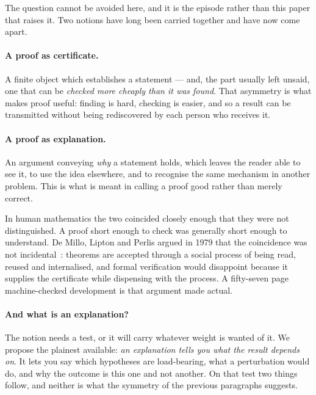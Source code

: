 \documentclass[11pt]{article}
\begin{document}
The question cannot be avoided here, and it is the episode rather than this paper that raises it. Two
notions have long been carried together and have now come apart.

\paragraph{A proof as certificate.} A finite object which establishes a statement --- and, the part
usually left unsaid, one that can be \emph{checked more cheaply than it was found}. That asymmetry is
what makes proof useful: finding is hard, checking is easier, and so a result can be transmitted
without being rediscovered by each person who receives it.

\paragraph{A proof as explanation.} An argument conveying \emph{why} a statement holds, which leaves
the reader able to see it, to use the idea elsewhere, and to recognise the same mechanism in another
problem. This is what is meant in calling a proof good rather than merely correct.

In human mathematics the two coincided closely enough that they were not distinguished. A proof short
enough to check was generally short enough to understand. De Millo, Lipton and Perlis argued in 1979
that the coincidence was not incidental~\cite{dlp}: theorems are accepted through a social process of
being read, reused and internalised, and formal verification would disappoint because it supplies the
certificate while dispensing with the process. A fifty-seven page machine-checked development is that
argument made actual.

\paragraph{And what is an explanation?} The notion needs a test, or it will carry whatever weight is
wanted of it. We propose the plainest available: \emph{an explanation tells you what the result
depends on}. It lets you say which hypotheses are load-bearing, what a perturbation would do, and
why the outcome is this one and not another. On that test two things follow, and neither is what the
symmetry of the previous paragraphs suggests.
\end{document}
